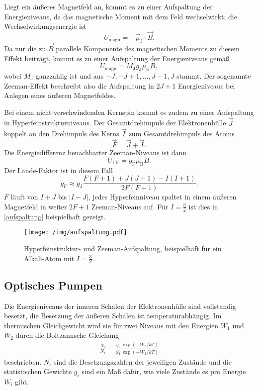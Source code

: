 Liegt ein äußeres Magnetfeld an, kommt es zu einer Aufspaltung der Energieniveaus, da das magnetische Moment mit dem Feld
wechselwirkt; die Wechselwirkungsenergie ist
\begin{equation}
  U_\text{magn} = -\vec{\mu}_\text{J}\cdot\vec{B}.
\end{equation}
Da nur die zu $\vec{B}$ parallele Komponente des magnetischen Moments zu diesem Effekt beiträgt, kommt es zu einer Aufspaltung
der Energieniveaus gemäß
\begin{equation}
  U_\text{magn} = M_\text{J}g_\text{J}\mu_\text{B}B,
\end{equation}
wobei $M_\text{J}$ ganzzahlig ist und aus $-J, -J+1, ..., J-1, J$ stammt. Der sogenannte Zeeman-Effekt beschreibt also die
Aufspaltung in $2J+1$ Energieniveaus bei Anlegen eines äußeren Magnetfeldes.

Bei einem nicht-verschwindenden Kernspin kommt es zudem zu einer Aufspaltung in Hyperfeinstrukturniveaus.
Der Gesamtdrehimpuls der Elektronenhülle $\vec{J}$ koppelt an den Drehimpuls des Kerns $\vec{I}$ zum Gesamtdrehimpuls des Atoms
\begin{equation}
  \vec{F} = \vec{J} + \vec{I}.
\end{equation}
Die Energiedifferenz benachbarter Zeeman-Niveaus ist dann
\begin{equation}
  U_\text{UF} = g_\text{F}\mu_\text{B}B.
\end{equation}
Der Lande-Faktor ist in diesem Fall
\begin{equation}
  g_\text{F} \approx g_\text{J}\frac{F(F+1)+J(J+1)-I(I+1)}{2F(F+1)}.
\end{equation}
$F$ läuft von $I+J$ bis $|I-J|$, jedes Hyperfeinniveau spaltet in einem äußeren Magnetfeld in weiter $2F+1$ Zeeman-Niveaus
auf. Für $I=\frac{3}{2}$ ist dies in \autoref{aufspaltung} beispielhaft gezeigt.
\begin{figure}
  \texttt{[image: /img/aufspaltung.pdf]}
  \caption{Hyperfeinstruktur- und Zeeman-Aufspaltung, beispielhaft für ein Alkali-Atom mit $I=\frac{3}{2}$.}
  \label{aufspaltung}
\end{figure}

\subsection{Optisches Pumpen}

Die Energieniveaus der inneren Schalen der Elektronenhülle sind vollstandig besetzt, die Besetzung der äußeren Schalen ist
temperaturabhängig. Im thermischen Gleichgewicht wird sie für zwei Niveaus mit den Energien $W_1$ und $W_2$ durch die
Boltzannsche Gleichung
\begin{align}
  \frac{N_2}{N_1} = \frac{g_2}{g_1}\frac{\exp(-W_2/kT)}{\exp(-W_1/kT)}
  \label{boltz}
\end{align}
beschrieben. $N_i$ sind die Besetzungszahlen der jeweiligen Zustände und die statistischen Gewichte $g_i$ sind ein Maß
dafür, wie viele Zustände es pro Energie $W_i$ gibt.

